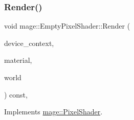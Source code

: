 \subsubsection{\texorpdfstring{Render()}{Render()}}
{\footnotesize\ttfamily void mage\+::\+Empty\+Pixel\+Shader\+::\+Render (\begin{DoxyParamCaption}\item[{\hyperlink{namespacemage_ae74f374780900893caa5555d1031fd79}{Com\+Ptr}$<$ I\+D3\+D11\+Device\+Context2 $>$}]{device\+\_\+context,  }\item[{const \hyperlink{structmage_1_1_material}{Material} \&}]{material,  }\item[{const \hyperlink{classmage_1_1_world}{World} \&}]{world }\end{DoxyParamCaption}) const\hspace{0.3cm}{\ttfamily [override]}, {\ttfamily [virtual]}}



Implements \hyperlink{classmage_1_1_pixel_shader_a2e47b753e60dc05cf2cc9d4acb87c343}{mage\+::\+Pixel\+Shader}.

